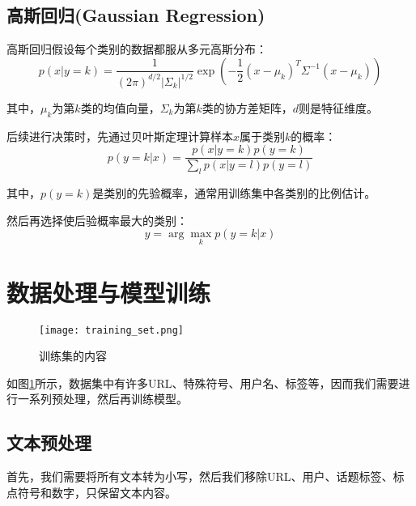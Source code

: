 \documentclass{ctexart}
\begin{document}
\subsection{高斯回归(Gaussian Regression)}

高斯回归假设每个类别的数据都服从多元高斯分布：
\begin{equation}
    p(x | y = k) = \frac{1}{(2 \pi)^{d/2} |\Sigma_k|^{1/2}} \exp (-\frac{1}{2} (x - \mu_k)^T \Sigma^{-1} (x-\mu_k))
\end{equation}\par
其中，$\mu_k$为第$k$类的均值向量，$\Sigma_k$为第$k$类的协方差矩阵，$d$则是特征维度。\par
后续进行决策时，先通过贝叶斯定理计算样本$x$属于类别$k$的概率：
\begin{equation}
    p(y = k | x) = \frac{p(x | y = k)p(y = k)}{\sum_{l} p(x| y = l)p(y = l)}
\end{equation}\par
其中，$p(y = k)$是类别的先验概率，通常用训练集中各类别的比例估计。\par
然后再选择使后验概率最大的类别：
\begin{equation}
    \hat{y} = \arg \max_k p(y = k | x)
\end{equation}

\section{数据处理与模型训练}

\begin{figure}
    \centering
    \texttt{[image: training\_set.png]}
    \caption{\label{training_set} 训练集的内容}
\end{figure}

如图\ref{training_set}所示，数据集中有许多URL、特殊符号、用户名、标签等，因而我们需要进行一系列预处理，然后再训练模型。

\subsection{文本预处理}

首先，我们需要将所有文本转为小写，然后我们移除URL、用户、话题标签、标点符号和数字，只保留文本内容。
\end{document}
